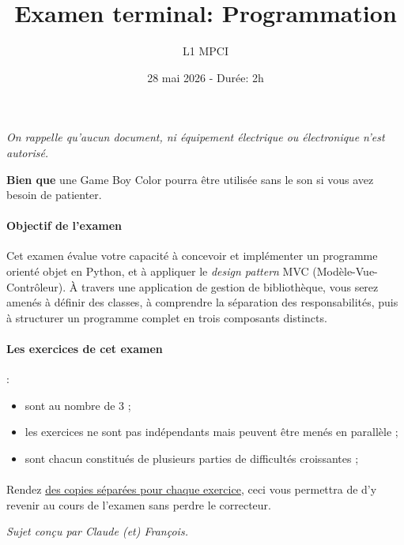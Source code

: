 \documentclass{article}
\title{Examen terminal: Programmation}
\author{L1 MPCI}
\date{28 mai 2026 - Durée: 2h}
\theoremstyle{exostyle}
\theoremstyle{partiestyle}
\theoremstyle{questionstyle}
\begin{document}
\maketitle

\begin{center}
{\em On rappelle qu'aucun document, ni équipement électrique ou électronique n'est autorisé.

{\bf Bien que} une Game Boy Color pourra être utilisée sans le son si vous avez besoin de patienter.}
\end{center}

\vspace*{1cm}

\paragraph{Objectif de l'examen} Cet examen évalue votre capacité à concevoir et implémenter un programme orienté objet en Python, et à appliquer le \textit{design pattern} MVC (Modèle-Vue-Contrôleur). À travers une application de gestion de bibliothèque, vous serez amenés à définir des classes, à comprendre la séparation des responsabilités, puis à structurer un programme complet en trois composants distincts.

\paragraph{Les exercices de cet examen} :
\begin{itemize}
\item sont au nombre de 3 ;
\item les exercices ne sont pas indépendants mais peuvent être menés en parallèle ;
\item sont chacun constitués de plusieurs parties de difficultés croissantes ;
\end{itemize}

\paragraph{}{\large \sc Rendez \underline{des copies séparées pour chaque exercice}, ceci vous permettra de d'y revenir au cours de l'examen sans perdre le correcteur.}

\vfill
\begin{center}
    {\small \em Sujet conçu par Claude (et) François.}
\end{center}

\clearpage
\end{document}
